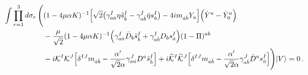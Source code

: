 \documentclass[12pt]{article}
\def\a{\alpha}
\def\g{\gamma}
\def\d{\delta}
\def\m{\mu}
\def\s{\sigma}
\def\mc{\mathcal}
\def\ra{\rangle}
\def\wt{\widetilde}
\numberwithin{equation}{section} \setlength{\textwidth}{17cm}
\begin{document}
\begin{equation}
\begin{split}
\int\prod_{r=1}^3d\s_r\,\Biggl(& (1-4\m\a K)^{-1}\Bigl[
\sqrt{2}\bigl(\g^I_{a\dot{a}}\eta\tilde{s}^I_{\dot{b}}-\g^{I}_{a\dot{b}}
\bar{\eta}s^I_{\dot{a}}\bigr)
-4im_{\dot{a}\dot{b}}Y_a\Bigr]\Bigl(\dot{Y}^a-\dot{Y}^a_0\Bigr)\\
&-\frac{\m}{\sqrt{2}}(1-4\m\a K)^{-1}
\Bigl(\g^I_{a\dot{a}}\bar{D}_b\tilde{s}^I_{\dot{b}}+\g^I_{a\dot{b}}D_b
s^I_{\dot{a}}\Bigr)(1-\Pi)^{ab}
\\
&-i{\mc K}^I{\mc 
K}^J\Bigl[\d^{IJ}m_{\dot{a}\dot{b}}-\frac{\a'}{\sqrt{2}\a}
\g^J_{a\dot{a}}D^a\tilde{s}^I_{\dot{b}}\Bigr]
+i\wt{\mc K}^I\wt{\mc 
K}^J\Bigl[\d^{IJ}m_{\dot{a}\dot{b}}-\frac{\a'}{\sqrt{2}   
\a}\g^J_{a\dot{b}}
\bar{D}^as^I_{\dot{a}}\Bigr]\Biggr)|V\ra=0\,.
\end{split}   
\end{equation}
\end{document}
